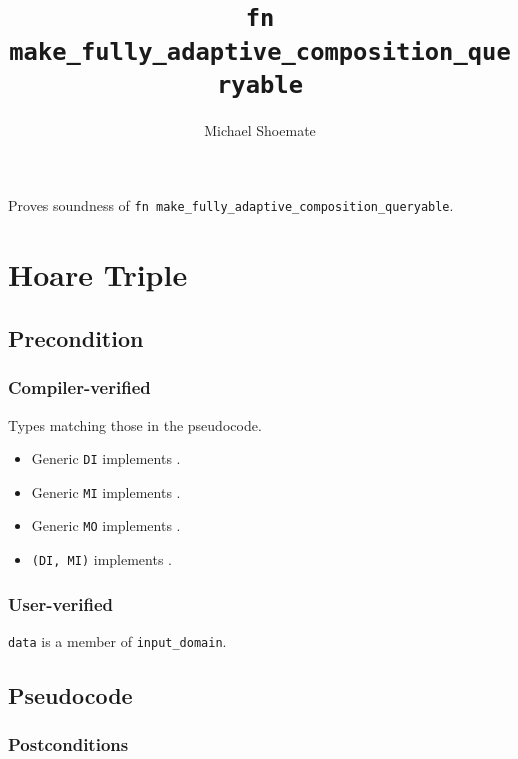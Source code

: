 \documentclass{article}
\title{\texttt{fn make\_fully\_adaptive\_composition\_queryable}}
\author{Michael Shoemate}
\date{}
\begin{document}
\maketitle

\contrib
Proves soundness of \texttt{fn make\_fully\_adaptive\_composition\_queryable}.

\section{Hoare Triple}
\subsection*{Precondition}
\subsubsection*{Compiler-verified}
Types matching those in the pseudocode.

\begin{itemize}
    \item Generic \texttt{DI} implements .
    \item Generic \texttt{MI} implements .
    \item Generic \texttt{MO} implements .
    \item \texttt{(DI, MI)} implements .
\end{itemize}
\subsubsection*{User-verified}
\texttt{data} is a member of \texttt{input\_domain}.


\subsection*{Pseudocode}


\subsubsection*{Postconditions}
\end{document}
